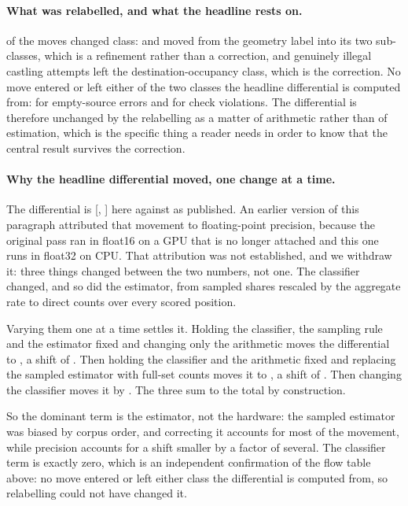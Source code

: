 \documentclass[11pt]{article}
\begin{document}
\paragraph{What was relabelled, and what the headline rests on.}
 of the  moves changed class:  and  moved from
the geometry label into its two sub-classes, which is a refinement rather than a
correction, and  genuinely illegal castling attempts left the
destination-occupancy class, which is the correction. No move entered or left either
of the two classes the headline differential is computed from:  for
empty-source errors and  for check violations. The differential is
therefore unchanged by the relabelling as a matter of arithmetic rather than of
estimation, which is the specific thing a reader needs in order to know that the
central result survives the correction.

\paragraph{Why the headline differential moved, one change at a time.}
The differential is  [, ] here
against  as published. An earlier version of this paragraph attributed that
movement to floating-point precision, because the original pass ran in float16 on a
GPU that is no longer attached and this one runs in float32 on CPU. That attribution
was not established, and we withdraw it: three things changed between the two
numbers, not one. The classifier changed, and so did the estimator, from sampled
shares rescaled by the aggregate rate to direct counts over every scored position.

Varying them one at a time settles it. Holding the classifier, the sampling rule and
the estimator fixed and changing only the arithmetic moves the differential to
, a shift of . Then holding the classifier and the arithmetic
fixed and replacing the sampled estimator with full-set counts moves it to
, a shift of . Then changing the classifier moves it by
. The three sum to the total  by construction.

So the dominant term is the estimator, not the hardware: the sampled estimator was
biased by corpus order, and correcting it accounts for most of the movement, while
precision accounts for a shift smaller by a factor of several. The classifier term is
exactly zero, which is an independent confirmation of the flow table above: no move
entered or left either class the differential is computed from, so relabelling could
not have changed it.
\end{document}

